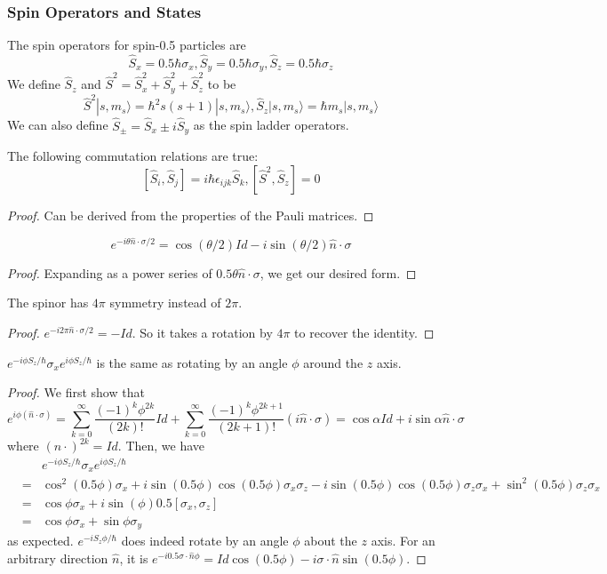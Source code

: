 \documentclass[a4paper]{article}
\begin{document}
\subsubsection*{Spin Operators and States}
\begin{defi}
The spin operators for spin-0.5 particles are
$$\hat{S}_x=0.5\hbar\sigma_x,\hat{S}_y=0.5\hbar\sigma_y,\hat{S}_z=0.5\hbar\sigma_z$$
We define $\hat{S}_z$ and $\hat{S}^2=\hat{S}_x^2+\hat{S}_y^2+\hat{S}_z^2$ to be
$$\hat{S}^2|s,m_s\rangle=\hbar^2s(s+1)|s,m_s\rangle,\hat{S}_z|s,m_s\rangle=\hbar m_s|s,m_s\rangle$$
We can also define $\hat{S}_\pm=\hat{S}_x\pm i\hat{S}_y$ as the spin ladder operators.
\end{defi}
\begin{thm}
The following commutation relations are true:
$$[\hat{S}_i,\hat{S}_j]=i\hbar\epsilon_{ijk}\hat{S}_k,[\hat{S}^2,\hat{S}_z]=0$$
\end{thm}
\begin{proof}
Can be derived from the properties of the Pauli matrices.
\end{proof}
\begin{thm}
$$e^{-i\theta\hat{n}\cdot\sigma/2}=\cos(\theta/2)Id-i\sin(\theta/2)\hat{n}\cdot\sigma$$
\end{thm}
\begin{proof} Expanding as a power series of $0.5\theta\hat{n}\cdot\sigma$, we get our desired form.
\end{proof}
\begin{cor}
The spinor has $4\pi$ symmetry instead of $2\pi$.
\end{cor}
\begin{proof}
$e^{-i2\pi\hat{n}\cdot\sigma/2}=-Id$. So it takes a rotation by $4\pi$ to recover the identity.
\end{proof}
\begin{thm}
$e^{-i\phi S_z/\hbar}\sigma_xe^{i\phi S_z/\hbar}$ is the same as rotating by an angle $\phi$ around the $z$ axis.
\end{thm}
\begin{proof}
We first show that
$$e^{i\phi(\hat{n}\cdot\sigma)}=\sum_{k=0}^\infty\frac{(-1)^k\phi^{2k}}{(2k)!}Id+\sum_{k=0}^\infty\frac{(-1)^k\phi^{2k+1}}{(2k+1)!}(i\hat{n}\cdot\sigma)=\cos\alpha Id+i\sin\alpha\hat{n}\cdot\sigma$$
where $(n\cdot)^{2k}=Id$. Then, we have
\begin{eqnarray}
& &e^{-i\phi S_z/\hbar}\sigma_xe^{i\phi S_z/\hbar}\nonumber\\&=&\cos^2(0.5\phi)\sigma_x+i\sin(0.5\phi)\cos(0.5\phi)\sigma_x\sigma_z-i\sin(0.5\phi)\cos(0.5\phi)\sigma_z\sigma_x+\sin^2(0.5\phi)\sigma_z\sigma_x\nonumber\\&=&\cos\phi\sigma_x+i\sin(\phi)0.5[\sigma_x,\sigma_z]\nonumber\\&=&\cos\phi\sigma_x+\sin\phi\sigma_y\nonumber
\end{eqnarray}
as expected. $e^{-iS_z\phi/\hbar}$ does indeed rotate by an angle $\phi$ about the $z$ axis. For an arbitrary direction $\hat{n}$, it is $e^{-i0.5\sigma\cdot\hat{n}\phi}=Id\cos(0.5\phi)-i\sigma\cdot\hat{n}\sin(0.5\phi)$.
\end{proof}
\end{document}
